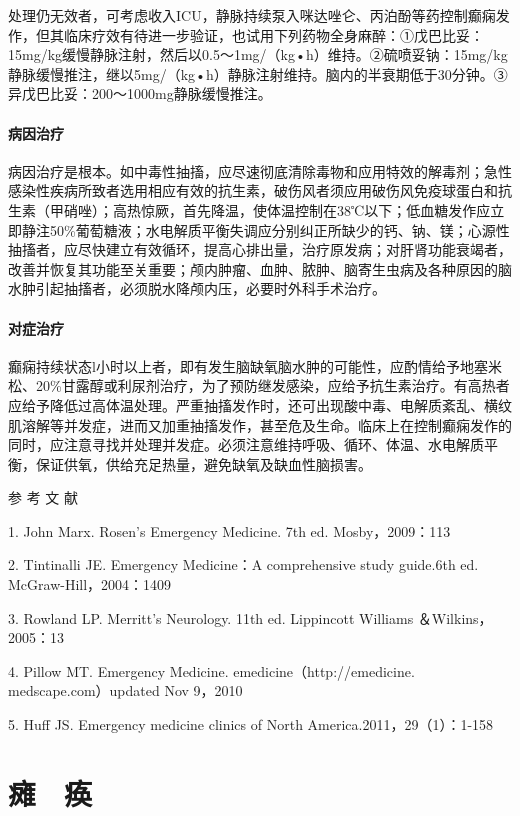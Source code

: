 处理仍无效者，可考虑收入ICU，静脉持续泵入咪达唑仑、丙泊酚等药控制癫痫发作，但其临床疗效有待进一步验证，也试用下列药物全身麻醉：①戊巴比妥：15mg/kg缓慢静脉注射，然后以0.5～1mg/（kg•h）维持。②硫喷妥钠：15mg/kg静脉缓慢推注，继以5mg/（kg•h）静脉注射维持。脑内的半衰期低于30分钟。③异戊巴比妥：200～1000mg静脉缓慢推注。

\subsubsection{病因治疗}

病因治疗是根本。如中毒性抽搐，应尽速彻底清除毒物和应用特效的解毒剂；急性感染性疾病所致者选用相应有效的抗生素，破伤风者须应用破伤风免疫球蛋白和抗生素（甲硝唑）；高热惊厥，首先降温，使体温控制在38℃以下；低血糖发作应立即静注50\%葡萄糖液；水电解质平衡失调应分别纠正所缺少的钙、钠、镁；心源性抽搐者，应尽快建立有效循环，提高心排出量，治疗原发病；对肝肾功能衰竭者，改善并恢复其功能至关重要；颅内肿瘤、血肿、脓肿、脑寄生虫病及各种原因的脑水肿引起抽搐者，必须脱水降颅内压，必要时外科手术治疗。

\subsubsection{对症治疗}

癫痫持续状态l小时以上者，即有发生脑缺氧脑水肿的可能性，应酌情给予地塞米松、20\%甘露醇或利尿剂治疗，为了预防继发感染，应给予抗生素治疗。有高热者应给予降低过高体温处理。严重抽搐发作时，还可出现酸中毒、电解质紊乱、横纹肌溶解等并发症，进而又加重抽搐发作，甚至危及生命。临床上在控制癫痫发作的同时，应注意寻找并处理并发症。必须注意维持呼吸、循环、体温、水电解质平衡，保证供氧，供给充足热量，避免缺氧及缺血性脑损害。


\hypertarget{text00017.htmlux5cux23CHP1-5-4}{}
参 考 文 献

1. John Marx. Rosen's Emergency Medicine. 7th ed. Mosby，2009：113

2. Tintinalli JE. Emergency Medicine：A comprehensive study guide.6th
ed. McGraw-Hill，2004：1409

3. Rowland LP. Merritt's Neurology. 11th ed. Lippincott Williams
＆Wilkins，2005：13

4. Pillow MT. Emergency Medicine. emedicine（http://emedicine.
medscape.com）updated Nov 9，2010

5. Huff JS. Emergency medicine clinics of North
America.2011，29（1）：1-158

\protect\hypertarget{text00018.html}{}{}

\chapter{瘫　痪}

